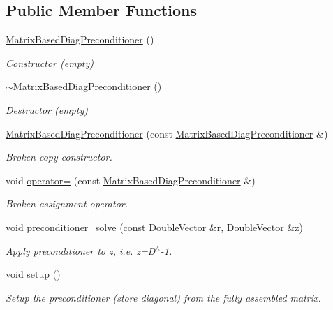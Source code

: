 \subsection*{Public Member Functions}
\begin{DoxyCompactItemize}
\item 
\hyperlink{classoomph_1_1MatrixBasedDiagPreconditioner_a8ed53c8e6a4b7a522d6b4042db14f58a}{Matrix\+Based\+Diag\+Preconditioner} ()
\begin{DoxyCompactList}\small\item\em Constructor (empty) \end{DoxyCompactList}\item 
\hyperlink{classoomph_1_1MatrixBasedDiagPreconditioner_ae828842bc06a5151173d9e403239caf1}{$\sim$\+Matrix\+Based\+Diag\+Preconditioner} ()
\begin{DoxyCompactList}\small\item\em Destructor (empty) \end{DoxyCompactList}\item 
\hyperlink{classoomph_1_1MatrixBasedDiagPreconditioner_a1dfcbd3db03bfa17afa519dd339d2ff4}{Matrix\+Based\+Diag\+Preconditioner} (const \hyperlink{classoomph_1_1MatrixBasedDiagPreconditioner}{Matrix\+Based\+Diag\+Preconditioner} \&)
\begin{DoxyCompactList}\small\item\em Broken copy constructor. \end{DoxyCompactList}\item 
void \hyperlink{classoomph_1_1MatrixBasedDiagPreconditioner_a2e604fdea080deb6eca9227fc756abc6}{operator=} (const \hyperlink{classoomph_1_1MatrixBasedDiagPreconditioner}{Matrix\+Based\+Diag\+Preconditioner} \&)
\begin{DoxyCompactList}\small\item\em Broken assignment operator. \end{DoxyCompactList}\item 
void \hyperlink{classoomph_1_1MatrixBasedDiagPreconditioner_a202ee7ff4183a585a0b9bd772e2cbcc1}{preconditioner\+\_\+solve} (const \hyperlink{classoomph_1_1DoubleVector}{Double\+Vector} \&r, \hyperlink{classoomph_1_1DoubleVector}{Double\+Vector} \&z)
\begin{DoxyCompactList}\small\item\em Apply preconditioner to z, i.\+e. z=D$^\wedge$-\/1. \end{DoxyCompactList}\item 
void \hyperlink{classoomph_1_1MatrixBasedDiagPreconditioner_abdc2e202dcf014e49373b4c180033d29}{setup} ()
\begin{DoxyCompactList}\small\item\em Setup the preconditioner (store diagonal) from the fully assembled matrix. \end{DoxyCompactList}\end{DoxyCompactItemize}
